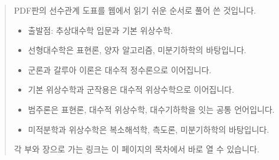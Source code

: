 \begin{quote}
PDF판의 선수관계 도표를 웹에서 읽기 쉬운 순서로 풀어 쓴 것입니다.
\begin{itemize}
  \item 출발점: 추상대수학 입문과 기본 위상수학.
  \item 선형대수학은 표현론, 양자 알고리즘, 미분기하학의 바탕입니다.
  \item 군론과 갈루아 이론은 대수적 정수론으로 이어집니다.
  \item 기본 위상수학과 군작용은 대수적 위상수학으로 이어집니다.
  \item 범주론은 표현론, 대수적 위상수학, 대수기하학을 잇는 공통 언어입니다.
  \item 미적분학과 위상수학은 복소해석학, 측도론, 미분기하학의 바탕입니다.
\end{itemize}
각 부와 장으로 가는 링크는 이 페이지의 목차에서 바로 열 수 있습니다.
\end{quote}
